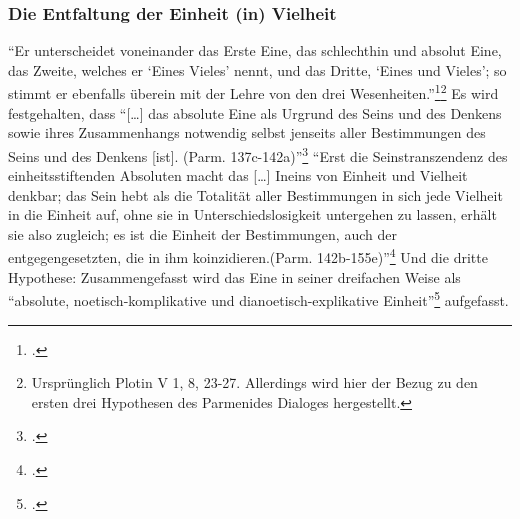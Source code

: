 \subsubsection{Die Entfaltung der Einheit (in) Vielheit}
\enquote{Er unterscheidet voneinander das Erste Eine, das schlechthin und absolut Eine, das Zweite, welches er \enquote{Eines Vieles} nennt, und das Dritte, \enquote{Eines und Vieles}; so stimmt er ebenfalls überein mit der Lehre von den drei Wesenheiten.}\footcite[][S. 187f.]{halfwassenaufstieg2006}\footnote{Ursprünglich Plotin V 1, 8, 23-27. Allerdings wird hier der Bezug zu den ersten drei Hypothesen des Parmenides Dialoges hergestellt.}
Es wird festgehalten, dass \enquote{[\dots] das absolute Eine als Urgrund des Seins und des Denkens sowie ihres Zusammenhangs notwendig selbst jenseits aller Bestimmungen des Seins und des Denkens [ist]. (Parm. 137c-142a)}\footcite[vgl.][S. 188f.]{halfwassenaufstieg2006}
\enquote{Erst die Seinstranszendenz des einheitsstiftenden Absoluten macht das [\dots] Ineins von Einheit und Vielheit denkbar; das Sein hebt als die Totalität aller Bestimmungen in sich jede Vielheit in die Einheit auf, ohne sie in Unterschiedslosigkeit untergehen zu lassen, erhält sie also zugleich; es ist die Einheit der Bestimmungen, auch der entgegengesetzten, die in ihm koinzidieren.(Parm. 142b-155e)}\footcite[vgl.][S. 189]{halfwassenaufstieg2006}
Und die dritte Hypothese:
Zusammengefasst wird das Eine in seiner dreifachen Weise als \enquote{absolute, noetisch-komplikative und dianoetisch-explikative Einheit}\footcite[][S. 190]{halfwassenaufstieg2006} aufgefasst.
